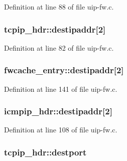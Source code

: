 Definition at line 88 of file uip-\/fw.c.

\hypertarget{group__uipfw_gaec3775d18acd7ecc7bb0fbe6f7987c43}{
\subsubsection[{destipaddr}]{ {\bf tcpip\_\-hdr::destipaddr}\mbox{[}2\mbox{]}}}
\label{group__uipfw_gaec3775d18acd7ecc7bb0fbe6f7987c43}


Definition at line 82 of file uip-\/fw.c.

\hypertarget{group__uipfw_ga94a2ece9168dc271a4524391b05c5b23}{
\subsubsection[{destipaddr}]{ {\bf fwcache\_\-entry::destipaddr}\mbox{[}2\mbox{]}}}
\label{group__uipfw_ga94a2ece9168dc271a4524391b05c5b23}


Definition at line 141 of file uip-\/fw.c.

\hypertarget{group__uipfw_gaf0f2e793d08337d303a01ef9ce681a86}{
\subsubsection[{destipaddr}]{ {\bf icmpip\_\-hdr::destipaddr}\mbox{[}2\mbox{]}}}
\label{group__uipfw_gaf0f2e793d08337d303a01ef9ce681a86}


Definition at line 108 of file uip-\/fw.c.

\hypertarget{group__uipfw_ga9824b382c2e5c3a39229c3c126700b42}{
\subsubsection[{destport}]{ {\bf tcpip\_\-hdr::destport}}}
\label{group__uipfw_ga9824b382c2e5c3a39229c3c126700b42}


